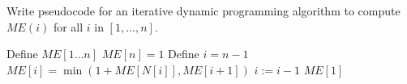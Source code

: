 \begin{questions}
\begin{soln}
	\end{soln}

	\question[4] Write pseudocode for an iterative dynamic programming algorithm to compute $ME(i)$ for all $i$ in $[1, \ldots, n]$.
	\ifsolutions\fi
	\begin{soln}
		\begin{algorithmic}[1]
			\State Define $ME[1 \dots n]$
			\State $ME[n] = 1$
			\State Define $i = n - 1$
			\State $ME[i] = \min(1 + ME[N[i]], ME[i+1])$
			\State $i := i - 1$
			\EndWhile
			\State \Return $ME[1]$
			\EndProcedure
		\end{algorithmic}
	\end{soln}


\end{questions}
